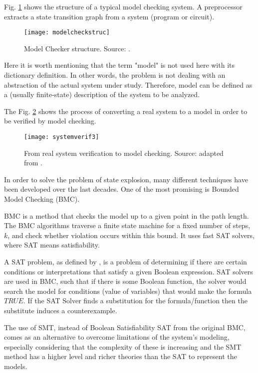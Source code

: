 Fig. \ref{fig:modelcheckstruc} shows the structure of a typical model checking system. A preprocessor extracts a state transition graph from a system (program or circuit).

\begin{figure}[h]
\texttt{[image: modelcheckstruc]}
\centering
\caption{Model Checker structure. Source: \cite{Clarke2008}.}
\label{fig:modelcheckstruc}
\end{figure}

Here it is worth mentioning that the term "model" is not used here with its dictionary definition. In other words, the problem is not dealing with an abstraction of the actual system under study. Therefore, model can be defined as a (usually finite-state) description of the system to be analyzed.

The Fig. \ref{fig:systemverif} shows the process of converting a real system to a model in order to be verified by model checking. 

\begin{figure}[h]
\texttt{[image: systemverif3]}
\centering
\caption{From real system verification to model checking. Source: adapted from \cite{Clarke2008}.}
\label{fig:systemverif}
\end{figure}

In order to solve the problem of state explosion, many different techniques have been developed over the last decades. One of the most promising is Bounded Model Checking (BMC). 

BMC is a method that checks the model up to a given point in the path length. The BMC algorithms traverse a finite state machine for a fixed number of steps, $k$, and check whether violation occurs within this bound. It uses fast SAT solvers, where SAT means satisfiability. 

A SAT problem, as defined by \cite{Clarke2008}, is a problem of determining if there are certain conditions or interpretations that satisfy a given Boolean expression. SAT solvers are used in BMC, such that if there is some Boolean function, the solver would search the model for conditions (value of variables) that would make the formula $TRUE$. If the SAT Solver finds a substitution for the formula/function then the substitute induces a counterexample.  

%
The use of SMT, instead of Boolean Satisfiability SAT from the original BMC, comes as an alternative to overcome limitations of the system's modeling, especially considering that the complexity of these is increasing and the SMT method has a higher level and richer theories than the SAT to represent the models. 


